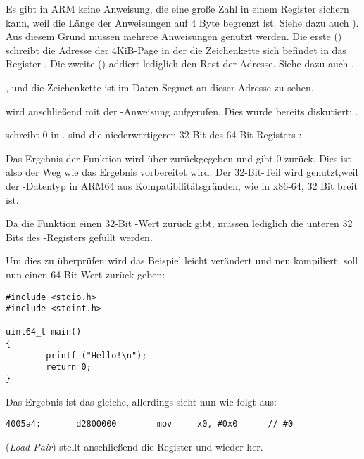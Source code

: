 Es gibt in ARM keine Anweisung, die eine große Zahl in einem Register sichern kann, weil die Länge der
Anweisungen auf 4 Byte begrenzt ist. Siehe dazu auch ).
Aus diesem Grund müssen mehrere Anweisungen genutzt werden. Die erste () schreibt die Adresse
der 4KiB-Page in der die Zeichenkette sich befindet in das Register .
Die zweite (\ADD) addiert lediglich den Rest der Adresse.
Siehe dazu auch .

, und die Zeichenkette  ist im  Daten-Segmet
an dieser Adresse zu sehen.


\puts wird anschließend mit der -Anweisung aufgerufen. Dies wurde bereits diskutiert: .

\MOV schreibt 0 in .
 sind die niederwertigeren 32 Bit des 64-Bit-Registers :



Das Ergebnis der Funktion wird über  zurückgegeben und \main gibt 0 zurück.
Dies ist also der Weg wie das Ergebnis vorbereitet wird.
Der 32-Bit-Teil wird genutzt,weil der \Tint-Datentyp in ARM64 aus Kompatibilitätsgründen,
wie in x86-64, 32 Bit breit ist.

Da die Funktion einen 32-Bit \Tint-Wert zurück gibt, müssen lediglich die unteren 32 Bits des
-Registers gefüllt werden.

Um dies zu überprüfen wird das Beispiel leicht verändert und neu kompiliert.
\main soll nun einen 64-Bit-Wert zurück geben:

\begin{lstlisting}[caption=\main gibt einen \TT{uint64\_t}-Datentyp zurück,style=customc]
#include <stdio.h>
#include <stdint.h>

uint64_t main()
{
        printf ("Hello!\n");
        return 0;
}
\end{lstlisting}

Das Ergebnis ist das gleiche, allerdings sieht \MOV nun wie folgt aus:

\begin{lstlisting}[caption=\NonOptimizing GCC 4.8.1 + objdump]
  4005a4:       d2800000        mov     x0, #0x0      // #0
\end{lstlisting}


 (\emph{Load Pair}) stellt anschließend die Register  und  wieder her.

